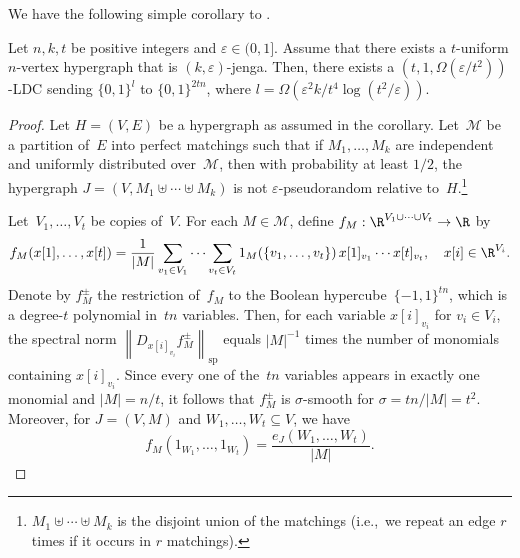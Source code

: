 \documentclass{toc}
\newcommand{\bset}[1]{\{0,1\}^{#1}} %
\newcommand{\pmset}[1]{\{-1,1\}^{#1}} %
\newcommand{\specnorm}[1]{\left\lVert #1 \right\rVert_{\mathrm{sp}}}
\newcommand{\eps}{\varepsilon}
\newcommand{\beqn}{\begin{equation*}}
\newcommand{\eeqn}{\end{equation*}}
\begin{document}
We have the following simple corollary to .

\begin{corollary}\label{cor:jenga_ldc}
Let $n,k,t$ be positive integers and $\eps \in (0,1]$.
Assume that there exists a $t$-uniform $n$-vertex hypergraph that is $(k, \eps)$-jenga.
Then, there exists a $(t, 1, \Omega(\eps/t^2))$-LDC sending $\bset{l}$ to $\bset{2tn}$, where $l = \Omega(\eps^2k/t^4\log(t^2/\eps))$.
\end{corollary}

\begin{proof}
Let $H = (V,E)$ be a hypergraph as assumed in the corollary.
Let~$\mathcal M$ be a partition of~$E$ into perfect matchings such that if $M_1,\dots,M_k$ are independent and uniformly distributed over~$\mathcal M$, then with probability at least $1/2$, the hypergraph $J = (V, M_1\uplus\cdots\uplus M_k)$ is not $\eps$-pseudorandom relative to~$H$.\footnote{$M_1\uplus\cdots\uplus M_k$ is the disjoint union of the matchings (i.e.,\ we repeat an edge $r$ times if it occurs in $r$ matchings).}

Let~$V_1,\dots,V_t$ be copies of~$V$.
For each $M\in \mathcal M$, define $f_M:\R^{V_1\cup\cdots\cup V_t}\to\R$ by
\beqn
f_M(x[1],\dots,x[t]) = \frac{1}{|M|}
\sum_{v_1\in V_1}\cdots\sum_{v_t\in V_t}
1_M(\{v_1,\dots,v_t\})\,
x[1]_{v_1}\cdots x[t]_{v_t},
\quad
x[i] \in \R^{V_i}.
\eeqn
Denote by $f_M^\pm$ the restriction of~$f_M$ to the Boolean hypercube~$\pmset{tn}$, which is a degree-$t$ polynomial in~$tn$ variables.
Then, for each variable $x[i]_{v_i}$ for $v_i\in V_i$, the spectral norm $\specnorm{D_{x[i]_{v_i}}f_M^\pm}$ equals $|M|^{-1}$ times the number of monomials containing $x[i]_{v_i}$.
Since every one of the~$tn$ variables appears in exactly one monomial and $|M| = n/t$, it follows that $f_M^\pm$ is $\sigma$-smooth for $\sigma = tn/|M| = t^2$.
Moreover, for $J = (V, M)$ and $W_1,\dots,W_t\subseteq V$, we have
\beqn
f_{M}(1_{W_1},\dots, 1_{W_t})
=
\frac{e_J(W_1,\dots,W_t)}{|M|}.
\eeqn


\end{proof}
\end{document}
